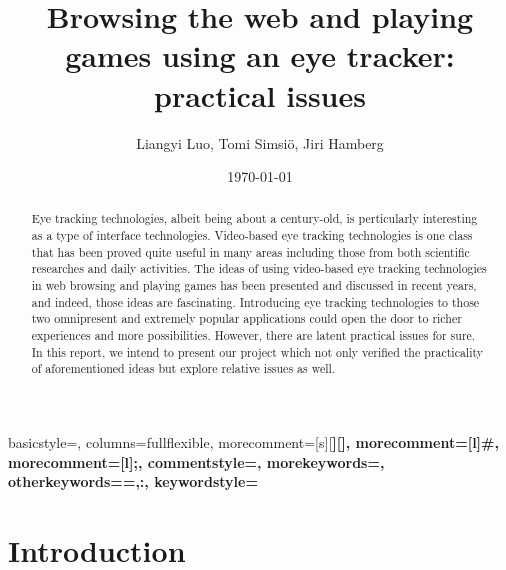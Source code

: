 \documentclass[english]{tktltiki}
\begin{document}
\onehalfspacing

{
    basicstyle=\ttfamily\small\singlespacing,
    columns=fullflexible,
    morecomment=[s][\color{Orchid}\bfseries]{[}{]},
    morecomment=[l]{\#},
    morecomment=[l]{;},
    commentstyle=\color{gray}\ttfamily,
    morekeywords={},
    otherkeywords={=,:},
    keywordstyle={\color{red}\bfseries}
}

\title{Browsing the web and playing games using an eye tracker: practical issues}
\author{Liangyi Luo, Tomi Simsiö, Jiri Hamberg }
\date{\today}

\maketitle


\keywords{ }

\begin{abstract}

Eye tracking technologies, albeit being about a century-old, is perticularly interesting as a type of interface technologies. Video-based eye tracking technologies is one class that has been proved quite useful in many areas including those from both scientific researches and daily activities. The ideas of using video-based eye tracking technologies in web browsing and playing games has been presented and discussed in recent years, and indeed, those ideas are fascinating. Introducing eye tracking technologies to those two omnipresent and extremely popular applications could open the door to richer experiences and more possibilities. However, there are latent practical issues for sure. In this report, we intend to present our project which not only verified the practicality of aforementioned ideas but explore relative issues as well.   


\end{abstract}

\mytableofcontents




\section{Introduction}
\end{document}
